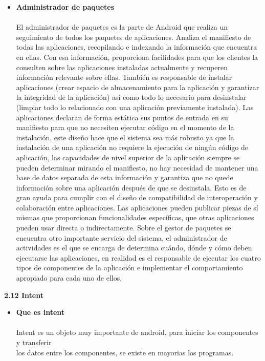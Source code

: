 \documentclass[a4paper]{article}
\begin{document}
\begin{itemize}
\item \textbf{Administrador de paquetes} \\ \\
El administrador de paquetes es la parte de Android que realiza un seguimiento de todos los paquetes de aplicaciones. Analiza el manifiesto de todas las aplicaciones, recopilando e indexando la información que encuentra en ellas. Con esa información, proporciona facilidades para que los clientes la consulten sobre las aplicaciones instaladas actualmente y recuperen información relevante sobre ellas. También es responsable de instalar aplicaciones (crear espacio de almacenamiento para la aplicación y garantizar la integridad de la aplicación) así como todo lo necesario para desinstalar (limpiar todo lo relacionado con una aplicación previamente instalada).
Las aplicaciones declaran de forma estática sus puntos de entrada en su manifiesto para que no necesiten ejecutar código en el momento de la instalación, este diseño hace que el sistema sea más robusto ya que la instalación de una aplicación no requiere la ejecución de ningún código de aplicación, las capacidades de nivel superior de la aplicación siempre se pueden determinar mirando el manifiesto, no hay necesidad de mantener una base de datos separada de esta información  y garantiza que no quede información sobre una aplicación después de que se desinstala. Esto es de gran ayuda para cumplir con el diseño de compatibilidad de interoperación y colaboración entre aplicaciones. Las aplicaciones pueden publicar piezas de sí mismas que proporcionan funcionalidades específicas, que otras aplicaciones pueden usar directa o indirectamente.
Sobre el gestor de paquetes se encuentra otro importante servicio del sistema, el administrador de actividades es el que se encarga de determina cuándo, dónde y cómo deben ejecutarse las aplicaciones, en realidad es el responsable de ejecutar los cuatro tipos de componentes de la aplicación e implementar el comportamiento apropiado para cada uno de ellos.
\end{itemize}



\newpage
\textbf{\Large{2.12 \; Intent}}\\[0.4em]
\begin{itemize}
\item \textbf{Que es intent} \\ \\
Intent es un objeto muy importante de android, para iniciar los 
componentes y transferir \\[0.3em] los datos entre los componentes, se existe en mayorias los programas. \\ 
\end{itemize}
\end{document}
